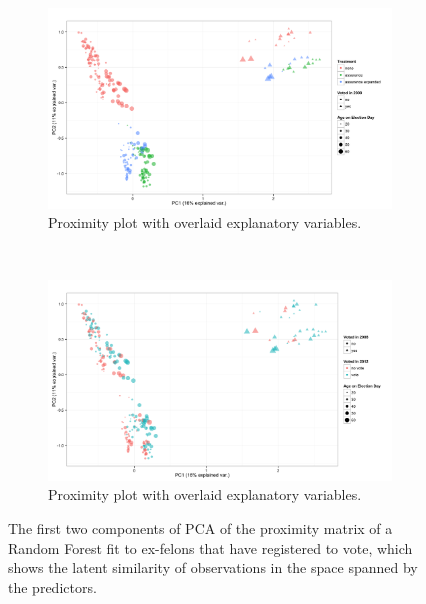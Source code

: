 \begin{figure}
        \centering
        \begin{subfigure}[b]{0.9\textwidth}
                \includegraphics[width=\textwidth]{figures/prox_cond_vote_top.png}
                \caption{Proximity plot with overlaid explanatory variables.}
                \label{fig:prox_top}
        \end{subfigure}%
        ~ %

        \begin{subfigure}[b]{0.9\textwidth}
                \includegraphics[width=\textwidth]{figures/prox_cond_vote_bottom.png}
                \caption{Proximity plot with overlaid explanatory variables.}
                \label{fig:prox_bottom}
        \end{subfigure}
        \caption{The first two components of PCA of the proximity matrix of a Random Forest fit to ex-felons that have registered to vote, which shows the latent similarity of observations in the space spanned by the predictors.}
        \label{fig:prox}
\end{figure}
